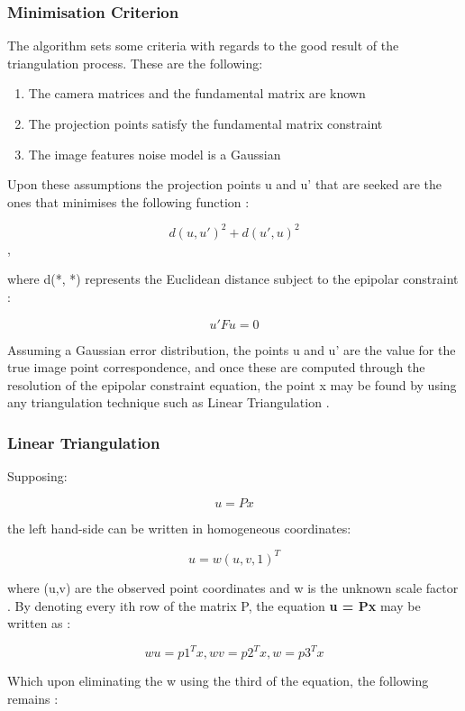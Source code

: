 \subsubsection{Minimisation Criterion}

The algorithm sets some criteria with regards to the good result of the triangulation process. These are the following:

\begin{enumerate}
  \item The camera matrices and the fundamental matrix are known
  \item The projection points satisfy the fundamental matrix constraint
  \item The image features noise model is a Gaussian
\end{enumerate}

Upon these assumptions the projection points u and u' that are seeked are the ones that minimises the following function \cite{hartley1997triangulation}:

\[d(u, u')^2 + d(u', u)^2\],

where d(*, *) represents the Euclidean distance subject to the epipolar constraint \cite{hartley1997triangulation}:

\[u'Fu = 0\]

Assuming a Gaussian error distribution, the points u and u' are the value for the true image point correspondence, and once these are computed through the resolution of the epipolar constraint equation, the point x may be found by using any triangulation technique such as Linear Triangulation \cite{hartley1997triangulation}.

\subsubsection{Linear Triangulation}

Supposing:

\[u = Px\]

the left hand-side can be written in homogeneous coordinates:

\[u = w(u, v, 1)^T\]

where (u,v) are the observed point coordinates and w is the unknown scale factor \cite{hartley1997triangulation}. By denoting every ith row of the matrix P, the equation \textbf{u = Px} may be written as \cite{hartley1997triangulation}:

\[wu = p1^Tx, wv = p2^Tx, w = p3^Tx\]

Which upon eliminating the w using the third of the equation, the following remains \cite{hartley1997triangulation}:

